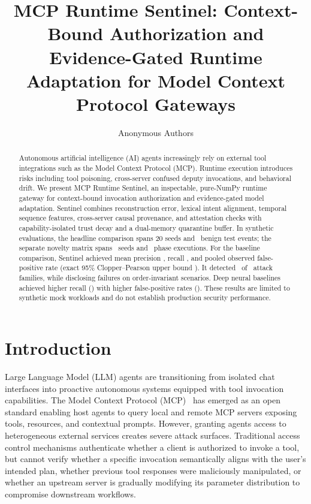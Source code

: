 \documentclass{llncs}
\begin{document}
\title{MCP Runtime Sentinel: Context-Bound Authorization and Evidence-Gated Runtime Adaptation for Model Context Protocol Gateways}

\author{Anonymous Authors}

\maketitle

\begin{abstract}
Autonomous artificial intelligence (AI) agents increasingly rely on external tool integrations such as the Model Context Protocol (MCP). Runtime execution introduces risks including tool poisoning, cross-server confused deputy invocations, and behavioral drift. We present MCP Runtime Sentinel, an inspectable, pure-NumPy runtime gateway for context-bound invocation authorization and evidence-gated model adaptation. Sentinel combines reconstruction error, lexical intent alignment, temporal sequence features, cross-server causal provenance, and attestation checks with capability-isolated trust decay and a dual-memory quarantine buffer. In synthetic evaluations, the headline comparison spans 20 seeds and \SentinelNormalEvents\ benign test events; the separate novelty matrix spans \NoveltySeedsCount\ seeds and \NoveltyPhasesCount\ phase executions. For the baseline comparison, Sentinel achieved mean precision \SentinelPrecision, recall \SentinelRecall, and pooled observed false-positive rate \SentinelObservedFPR (exact 95\% Clopper--Pearson upper bound \SentinelFPRBound). It detected \DetectedAttackFamilies\ of \TotalAttackFamilies\ attack families, while disclosing failures on order-invariant scenarios. Deep neural baselines achieved higher recall (\DenseAERecall) with higher false-positive rates (\DenseAECalibrationFPR). These results are limited to synthetic mock workloads and do not establish production security performance.
\end{abstract}

\section{Introduction}
Large Language Model (LLM) agents are transitioning from isolated chat interfaces into proactive autonomous systems equipped with tool invocation capabilities. The Model Context Protocol (MCP)~\cite{anthropic2024mcp} has emerged as an open standard enabling host agents to query local and remote MCP servers exposing tools, resources, and contextual prompts. However, granting agents access to heterogeneous external services creates severe attack surfaces. Traditional access control mechanisms authenticate whether a client is authorized to invoke a tool, but cannot verify whether a specific invocation semantically aligns with the user's intended plan, whether previous tool responses were maliciously manipulated, or whether an upstream server is gradually modifying its parameter distribution to compromise downstream workflows.
\end{document}
